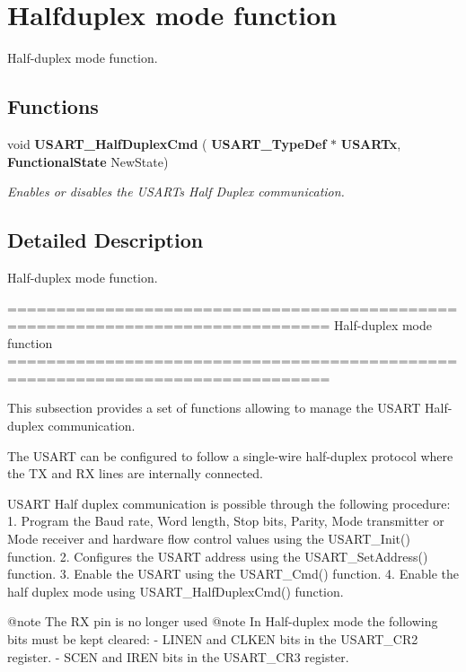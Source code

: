 \section{Halfduplex mode function}
\label{group__USART__Group5}


Half-\/duplex mode function.  


\subsection*{Functions}
\begin{DoxyCompactItemize}
\item 
void \textbf{ U\+S\+A\+R\+T\+\_\+\+Half\+Duplex\+Cmd} (\textbf{ U\+S\+A\+R\+T\+\_\+\+Type\+Def} $\ast$\textbf{ U\+S\+A\+R\+Tx}, \textbf{ Functional\+State} New\+State)
\begin{DoxyCompactList}\small\item\em Enables or disables the U\+S\+A\+RT\textquotesingle{}s Half Duplex communication. \end{DoxyCompactList}\end{DoxyCompactItemize}


\subsection{Detailed Description}
Half-\/duplex mode function. 

\begin{DoxyVerb} ===============================================================================
                         Half-duplex mode function
 ===============================================================================  

  This subsection provides a set of functions allowing to manage the USART 
  Half-duplex communication.
  
  The USART can be configured to follow a single-wire half-duplex protocol where 
  the TX and RX lines are internally connected.

  USART Half duplex communication is possible through the following procedure:
     1. Program the Baud rate, Word length, Stop bits, Parity, Mode transmitter 
        or Mode receiver and hardware flow control values using the USART_Init()
        function.
     2. Configures the USART address using the USART_SetAddress() function.
     3. Enable the USART using the USART_Cmd() function.
     4. Enable the half duplex mode using USART_HalfDuplexCmd() function.


@note The RX pin is no longer used
@note In Half-duplex mode the following bits must be kept cleared:
        - LINEN and CLKEN bits in the USART_CR2 register.
        - SCEN and IREN bits in the USART_CR3 register.\end{DoxyVerb}
 

